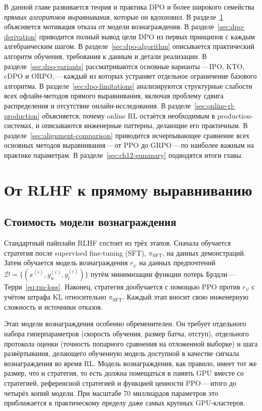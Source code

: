 В данной главе развивается теория и практика DPO и более широкого семейства \emph{прямых алгоритмов выравнивания}, которые он вдохновил. В разделе~\ref{sec:dpo-motivation} объясняется мотивация отказа от модели вознаграждения. В разделе~\ref{sec:dpo-derivation} приводится полный вывод цели DPO из первых принципов с каждым алгебраическим шагом. В разделе~\ref{sec:dpo-algorithm} описывается практический алгоритм обучения, требования к данным и детали реализации. В разделе~\ref{sec:dpo-variants} рассматриваются основные варианты\,---\,IPO, KTO, cDPO и ORPO,\,---\,каждый из которых устраняет отдельное ограничение базового алгоритма. В разделе~\ref{sec:dpo-limitations} анализируются структурные слабости всех офлайн-методов прямого выравнивания, включая проблему сдвига распределения и отсутствие онлайн-исследования. В разделе~\ref{sec:online-rl-production} объясняется, почему online RL остаётся необходимым в production-системах, и описываются инженерные паттерны, делающие его практичным. В разделе~\ref{sec:alignment-comparison} приводится исчерпывающее сравнение всех основных методов выравнивания\,---\,от PPO до GRPO\,---\,по наиболее важным на практике параметрам. В разделе~\ref{sec:ch12-summary} подводятся итоги главы.

\section{От RLHF к прямому выравниванию}
\label{sec:dpo-motivation}

\subsection{Стоимость модели вознаграждения}

Стандартный пайплайн RLHF состоит из трёх этапов. Сначала обучается стратегия после supervised fine-tuning (SFT), $\pi_\mathrm{SFT}$, на данных демонстраций. Затем обучается модель вознаграждения $r_\psi$ на данных предпочтений $\mathcal{D} = \{(x^{(i)}, y_w^{(i)}, y_l^{(i)})\}$ путём минимизации функции потерь Брэдли\,---\,Терри~\eqref{eq:rm-loss}. Наконец, стратегия дообучается с помощью PPO против $r_\psi$ с учётом штрафа KL относительно $\pi_\mathrm{SFT}$. Каждый этап вносит свою инженерную сложность и источники отказов.

Этап модели вознаграждения особенно обременителен. Он требует отдельного набора гиперпараметров (скорость обучения, размер батча, отступ), отдельного протокола оценки (точность попарного сравнения на отложенной выборке) и шага развёртывания, делающего обученную модель доступной в качестве сигнала вознаграждения во время RL. Модель вознаграждения, как правило, имеет тот же размер, что и стратегия, то есть должна помещаться в память GPU вместе со стратегией, референсной стратегией и функцией ценности PPO\,---\,итого до четырёх копий модели. При масштабе 70 миллиардов параметров это приближается к практическому пределу даже самых крупных GPU-кластеров.


